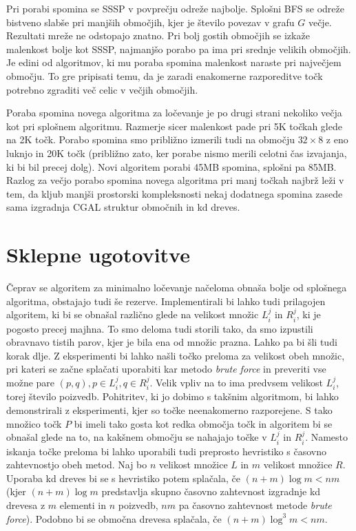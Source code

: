 \documentclass[a4paper, 12pt]{book}
\begin{document}
Pri porabi spomina se SSSP v povprečju odreže najbolje. Splošni BFS se odreže bistveno slabše pri manjših območjih, kjer je število povezav v grafu $G$ večje. Rezultati mreže ne odstopajo znatno. Pri bolj gostih območjih se izkaže malenkost bolje kot SSSP, najmanjšo porabo pa ima pri srednje velikih območjih. Je edini od algoritmov, ki mu poraba spomina malenkost naraste pri največjem območju. To gre pripisati temu, da je zaradi enakomerne razporeditve točk potrebno zgraditi več celic v večjih območjih. 

Poraba spomina novega algoritma za ločevanje je po drugi strani nekoliko večja kot pri splošnem algoritmu. Razmerje sicer malenkost pade pri 5K točkah glede na 2K točk. Porabo spomina smo približno izmerili tudi na območju $32\times 8$ z eno luknjo in 20K točk (približno zato, ker porabe nismo merili celotni čas izvajanja, ki bi bil precej dolg). Novi algoritem porabi 45MB spomina, splošni pa 85MB. Razlog za večjo porabo spomina novega algoritma pri manj točkah najbrž leži v tem, da kljub manjši prostorski kompleksnosti nekaj dodatnega spomina zasede sama izgradnja CGAL struktur območnih in kd dreves. 
\chapter{Sklepne ugotovitve}
\label{ch4}

Čeprav se algoritem za minimalno ločevanje načeloma obnaša bolje od splo\-šne\-ga algoritma, obstajajo tudi še rezerve. Implementirali bi lahko tudi prilagojen algoritem, ki bi se obnašal različno glede na velikost množic $L_i^j$ in $R_i^j$, ki je pogosto precej majhna. To smo deloma tudi storili tako, da smo izpustili obravnavo  tistih parov, kjer je bila ena od množic prazna. Lahko pa bi šli tudi korak dlje. Z eksperimenti bi lahko našli točko preloma za velikost obeh množic, pri kateri se začne splačati uporabiti kar metodo \textit{brute force} in preveriti vse možne pare $(p,q), p\in L_i^j, q\in R_i^j$. Velik vpliv na to ima predvsem velikost $L_i^j$, torej število poizvedb. Pohitritev, ki jo dobimo s takšnim algoritmom, bi lahko demonstrirali z eksperimenti, kjer so točke neenakomerno razporejene. S tako množico točk $P$ bi imeli tako gosta kot redka območja točk in algoritem bi se obnašal glede na to, na kakšnem območju se nahajajo točke v $L_i^j$ in $R_i^j$. Namesto iskanja točke preloma bi lahko uporabili tudi preprosto hevristiko s časovno zahtevnostjo obeh metod. Naj bo $n$ velikost množice $L$ in $m$ velikost množice $R$. Uporaba kd dreves bi se s hevristiko potem splačala, če $(n+m)\log m < nm$ (kjer $(n+m)\log m$ predstavlja skupno časovno zahtevnost izgradnje kd drevesa z $m$ elementi in $n$ poizvedb, $nm$ pa časovno zahtevnost metode \textit{brute force}). Podobno bi se območna drevesa splačala, če $(n+m)\log^3 m < nm$.
\end{document}
